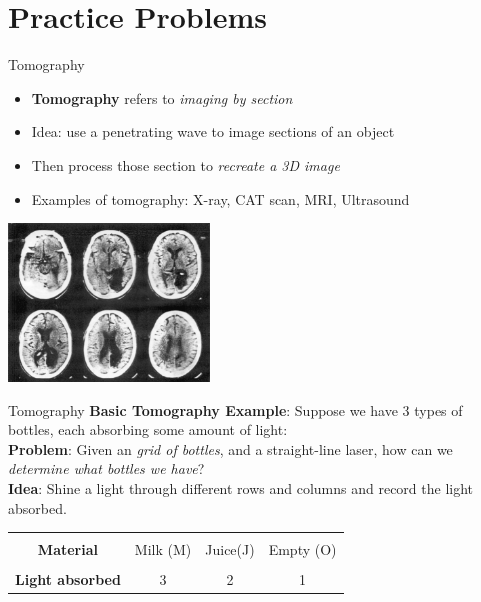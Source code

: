\section{Practice Problems}

\begin{frame}{Tomography}
    \begin{itemize}
        \item \textbf{Tomography} refers to \textit{imaging by section}
        \item Idea: use a penetrating wave to image sections of an object
        \item Then process those section to \textit{recreate a 3D image}
        \item Examples of tomography: X-ray, CAT scan, MRI, Ultrasound
    \end{itemize}
    \begin{center}
        \includegraphics[width = 0.4\textwidth]{images/tomography.png}
    \end{center}
\end{frame}

\begin{frame}{Tomography}
    \textbf{Basic Tomography Example}: Suppose we have 3 types of bottles, each absorbing some amount of light: \\[1.5ex]

    \textbf{Problem}: Given an \textit{grid of bottles}, and a straight-line laser, how can we \textit{determine what bottles we have}? \\[1.5ex]
    \textbf{Idea}: Shine a light through different rows and columns and record the light absorbed. \\[1.5ex]

    \begin{center}
        \begin{tabular}{| c | c | c | c|}
            \hline &&& \\
            \textbf{Material} & Milk (M) & Juice(J) & Empty (O) \\
            \hline &&& \\
            \textbf{Light absorbed} & 3 & 2 & 1 \\
            \hline
        \end{tabular}
    \end{center}
\end{frame}

